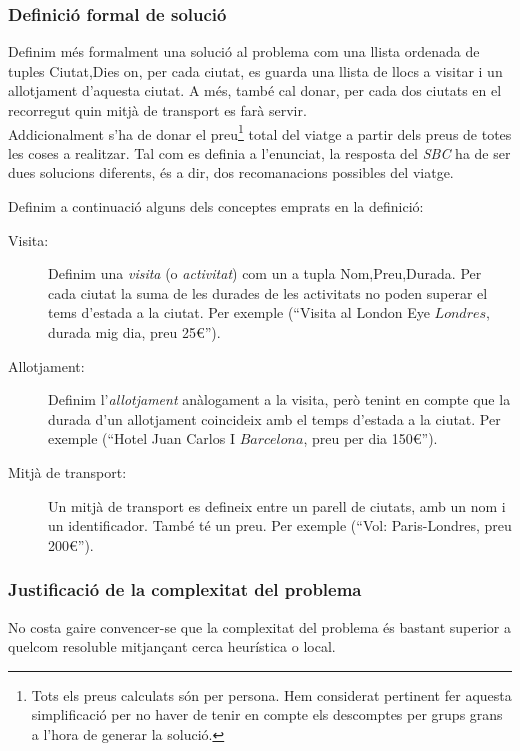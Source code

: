 \documentclass[11pt,a4paper]{article}
\begin{document}
\subsubsection{Definició formal de solució}
\label{sec:solucio_formal}
Definim més formalment una solució al problema com una llista ordenada de tuples \big \langle Ciutat,Dies\big \rangle{} on, per cada ciutat, es guarda una llista de llocs a visitar i un allotjament d'aquesta ciutat. A més, també cal donar, per cada dos ciutats en el recorregut quin mitjà de transport es farà servir.\\
Addicionalment s'ha de donar el preu\footnote{Tots els preus calculats són per persona. Hem considerat pertinent fer aquesta simplificació per no haver de tenir en compte els descomptes per grups grans a l'hora de generar la solució.} total del viatge a partir dels preus de totes les coses a realitzar. Tal com es definia a l'enunciat, la resposta del \emph{SBC} ha de ser dues solucions diferents, és a dir, dos recomanacions possibles del viatge.

Definim a continuació alguns dels conceptes emprats en la definició:

\begin{description}
	\item[Visita:] Definim una \emph{visita} (o \emph{activitat}) com un a tupla \big \langle Nom,Preu,Durada\big \rangle{}. Per cada ciutat la suma de les durades de les activitats no poden superar el tems d'estada a la ciutat. Per exemple (``Visita al London Eye \(Londres\), durada mig dia, preu 25\euro'').
	\item[Allotjament:] Definim l'\emph{allotjament} anàlogament a la visita, però tenint en compte que la durada d'un allotjament coincideix amb el temps d'estada a la ciutat. Per exemple (``Hotel Juan Carlos I \(Barcelona\), preu per dia 150\euro'').
	\item[Mitjà de transport:] Un mitjà de transport es defineix entre un parell de ciutats, amb un nom i un identificador. També té un preu. Per exemple (``Vol: Paris-Londres, preu 200\euro'').
\end{description}

\subsubsection{Justificació de la complexitat del problema}
No costa gaire convencer-se que la complexitat del problema és bastant superior a quelcom resoluble mitjançant cerca heurística o local.
\end{document}
